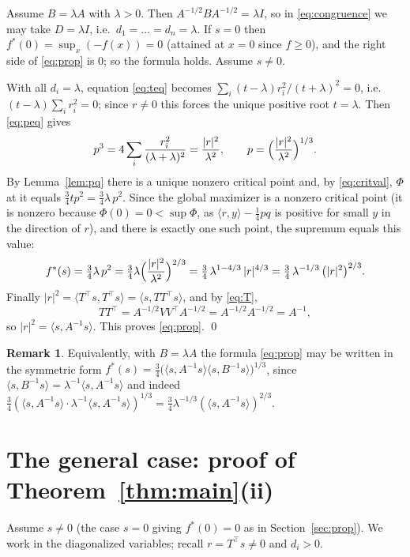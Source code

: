 \documentclass{amsart}
\theoremstyle{definition}
\newtheorem{remark}{Remark}
\begin{document}
Assume $B=\lambda A$ with $\lambda>0$. Then $A^{-1/2}BA^{-1/2}=\lambda I$, so in \eqref{eq:congruence} we may take $D=\lambda I$, i.e.\ $d_1=\dots=d_n=\lambda$. If $s=0$ then $f^*(0)=\sup_x(-f(x))=0$ (attained at $x=0$ since $f\ge0$), and the right side of \eqref{eq:prop} is $0$; so the formula holds. Assume $s\ne0$.

With all $d_i=\lambda$, equation \eqref{eq:teq} becomes $\sum_i (t-\lambda)r_i^2/(t+\lambda)^2=0$, i.e.\ $(t-\lambda)\sum_i r_i^2=0$; since $r\ne0$ this forces the unique positive root $t=\lambda$. Then \eqref{eq:peq} gives
\[
p^3=4\sum_i\frac{r_i^2}{(\lambda+\lambda)^2}=\frac{|r|^2}{\lambda^2},\qquad p=\Bigl(\frac{|r|^2}{\lambda^2}\Bigr)^{1/3}.
\]
By Lemma~\ref{lem:pq} there is a unique nonzero critical point and, by \eqref{eq:critval}, $\Phi$ at it equals $\tfrac34 t p^2=\tfrac34\lambda\,p^2$. Since the global maximizer is a nonzero critical point (it is nonzero because $\Phi(0)=0<\sup\Phi$, as $\langle r,y\rangle-\tfrac14 p q$ is positive for small $y$ in the direction of $r$), and there is exactly one such point, the supremum equals this value:
\[
f^*(s)=\tfrac34\lambda\,p^2=\tfrac34\lambda\Bigl(\frac{|r|^2}{\lambda^2}\Bigr)^{2/3}
=\tfrac34\,\lambda^{1-4/3}\,|r|^{4/3}=\tfrac34\,\lambda^{-1/3}\,\bigl(|r|^2\bigr)^{2/3}.
\]
Finally $|r|^2=\langle T^\top s,T^\top s\rangle=\langle s,TT^\top s\rangle$, and by \eqref{eq:T},
\[
TT^\top=A^{-1/2}VV^\top A^{-1/2}=A^{-1/2}A^{-1/2}=A^{-1},
\]
so $|r|^2=\langle s,A^{-1}s\rangle$. This proves \eqref{eq:prop}. \qed

\begin{remark}
Equivalently, with $B=\lambda A$ the formula \eqref{eq:prop} may be written in the symmetric form $f^*(s)=\tfrac34\bigl(\langle s,A^{-1}s\rangle\langle s,B^{-1}s\rangle\bigr)^{1/3}$, since $\langle s,B^{-1}s\rangle=\lambda^{-1}\langle s,A^{-1}s\rangle$ and indeed $\tfrac34(\langle s,A^{-1}s\rangle\cdot\lambda^{-1}\langle s,A^{-1}s\rangle)^{1/3}=\tfrac34\lambda^{-1/3}(\langle s,A^{-1}s\rangle)^{2/3}$.
\end{remark}

\section{The general case: proof of Theorem~\ref{thm:main}(ii)}\label{sec:general}

Assume $s\ne0$ (the case $s=0$ giving $f^*(0)=0$ as in Section~\ref{sec:prop}). We work in the diagonalized variables; recall $r=T^\top s\ne0$ and $d_i>0$.
\end{document}
